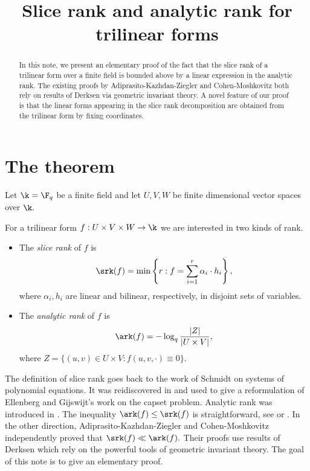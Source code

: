 
\title{Slice rank and analytic rank for trilinear forms}
\begin{abstract}
In this note, we present an elementary proof of the fact that the slice rank of a trilinear form over a finite field is bounded above by a linear expression in the analytic rank. The existing proofs by Adiprasito-Kazhdan-Ziegler and Cohen-Moshkovitz both rely on results of Derksen via geometric invariant theory. A novel feature of our proof is that the linear forms appearing in the slice rank decomposition are obtained from the trilinear form by fixing coordinates.
\end{abstract}
\maketitle

\section{The theorem}
Let $\k = \F_q$ be a finite field and let $U,V,W$ be finite dimensional vector spaces over $\k.$  
\begin{definition}\label{rk-def} 
For a trilinear form $f:U\times V\times W\to\k$ we are interested in two kinds of rank.
\begin{itemize}
    \item The \emph{slice rank} of $f$ is 
    \[
    \srk(f) = \min\left\{r: f = \sum_{i=1}^r \alpha_i\cdot h_i\right\},
    \]
    where $\alpha_i,h_i$ are linear and bilinear, respectively, in disjoint sets of variables.
    \item The \emph{analytic rank} of $f$ is 
    \[
    \ark(f) = -\log_q \frac{|Z|}{|U\times V|},
    \]
    where $Z = \{(u,v)\in U\times V: f(u,v,\cdot) \equiv 0\}.$
\end{itemize}
    
\end{definition}

The definition of slice rank goes back to the work of Schmidt \cite{S} on systems of polynomial equations. It was reidiscovered in \cite{T} and used to give a reformulation of Ellenberg and Gijswijt's work on the capset problem. Analytic rank was introduced in \cite{GW}. The inequality $\ark(f)\le \srk(f)$ is straightforward, see \cite{KZ} or \cite{L}. In the other direction, Adiprasito-Kazhdan-Ziegler \cite{AKZ} and Cohen-Moshkovitz \cite{CM-cubics} independently proved that $\srk(f) \ll \ark(f).$ Their proofs use results of Derksen \cite{D} which rely on the powerful tools of geometric invariant theory. The goal of this note is to give an elementary proof.

